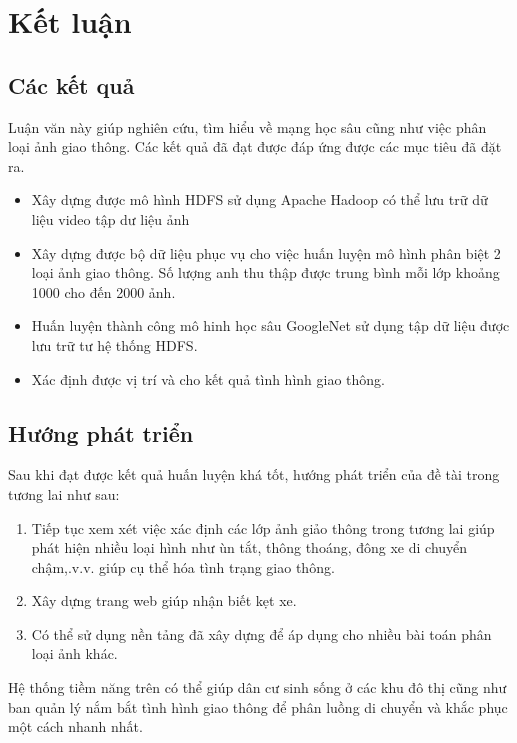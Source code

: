 \chapter{Kết luận}

\section{Các kết quả }
Luận văn này giúp nghiên cứu, tìm hiểu về mạng học sâu cũng như việc phân loại ảnh giao thông. Các kết quả đã đạt được đáp ứng được các mục tiêu đã đặt ra.
	\begin{itemize}
		\item Xây dựng được mô hình HDFS sử dụng Apache Hadoop có thể lưu trữ dữ liệu video tập dư liệu ảnh
		\item Xây dựng được bộ dữ liệu phục vụ cho việc huấn luyện mô hình phân biệt 2 loại ảnh giao thông. Số lượng anh thu thập được trung bình mỗi lớp khoảng 1000 cho đến 2000 ảnh.
		\item Huấn luyện thành công mô hinh học sâu GoogleNet sử dụng tập dữ liệu được lưu trữ tư hệ thống HDFS.
		\item Xác định được vị trí và cho kết quả tình hình giao thông.
	
	\end{itemize}
\section{Hướng phát triển}
Sau khi đạt được kết quả huấn luyện khá tốt, hướng phát triển của đề tài trong tương lai như sau:
\begin{enumerate}
	\item Tiếp tục xem xét việc xác định các lớp ảnh giảo thông trong tương lai giúp phát hiện nhiều loại hình như ùn tắt, thông thoáng, đông xe di chuyển chậm,.v.v. giúp cụ thể hóa tình trạng giao thông.
	\item Xây dựng trang web giúp nhận biết kẹt xe.
	\item Có thể sử dụng nền tảng đã xây dựng để áp dụng cho nhiều bài toán phân loại ảnh khác.
\end{enumerate}
	

Hệ thống tiềm năng trên có thể giúp dân cư sinh sống ở các khu đô thị cũng như ban quản lý nắm bắt tình hình giao thông để phân luồng di chuyển và khắc phục một cách nhanh nhất.